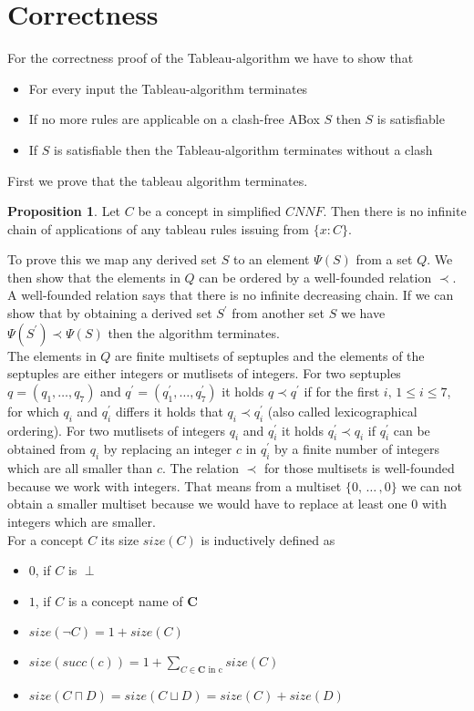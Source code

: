 \documentclass[a4paper,11pt]{scrartcl}
\theoremstyle{break}
\theoremstyle{definition}
\newtheorem{mypro}{Proposition}
\begin{document}
\section{Correctness}
For the correctness proof of the Tableau-algorithm we have to show that
\begin{itemize}
\item For every input the Tableau-algorithm terminates
\item If no more rules are applicable on a clash-free ABox $S$ then $S$ is satisfiable
\item If $S$ is satisfiable then the Tableau-algorithm terminates without a clash
\end{itemize}
First we prove that the tableau algorithm terminates. 
\begin{mypro}
Let $C$ be a concept in simplified $CNNF$. Then there is no infinite chain of applications of any tableau rules issuing from $\{x:C\}$. 
\end{mypro}
To prove this we map any derived set $S$ to an element $\Psi(S)$ from a set $Q$. We then show that the elements in $Q$ can be ordered by a well-founded relation $\prec$. A well-founded relation says that there is no infinite decreasing chain. If we can show that by obtaining a derived set $S^\prime$ from another set $S$ we have $\Psi(S^\prime)\prec\Psi(S)$ then the algorithm terminates.\\
The elements in $Q$ are finite multisets of septuples and the elements of the septuples are either integers or mutlisets of integers. For two septuples $q=(q_1,\dots,q_7)$ and $q^\prime=(q^\prime_1,\dots,q^\prime_7)$ it holds $q\prec q^\prime$ if for the first $i,\, 1\leq i\leq 7$, for which $q_i$ and $q_i^\prime$ differs it holds that $q_i\prec q_i^\prime$ (also called lexicographical ordering). For two mutlisets of integers $q_i$ and $q_i^\prime$ it holds $q_i^\prime\prec q_i$ if $q_i^\prime$ can be obtained from $q_i$ by replacing an integer $c$ in $q_i^\prime$ by a finite number of integers which are all smaller than $c$. The relation $\prec$ for those multisets is well-founded because we work with integers. That means from a multiset $\{0,\,\dots\,,0\}$ we can not obtain a smaller multiset because we would have to replace at least one $0$ with integers which are smaller.\\
For a concept $C$ its size $size(C)$ is inductively defined as
\begin{itemize}
\item $0$, if $C$ is $\perp$
\item $1$, if $C$ is a concept name of $\mathbf{C}$
\item $size(\neg C)= 1+size(C)$
\item $size(succ(c))= 1 + \sum_{C\in\mathbf{C}\text{ in c}} size(C)$
\item $size(C\sqcap D)=size(C\sqcup D)=size(C)+size(D)$
\end{itemize}
\end{document}
